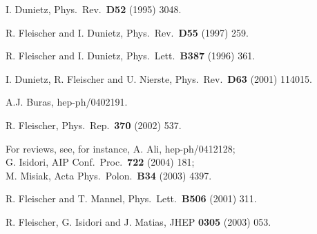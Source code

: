 \documentclass[11pt]{cernrep}
\begin{document}
\begin{thebibliography}{999}
I. Dunietz,
{ Phys.\ Rev.}~{\bf D52} (1995) 3048.

R. Fleischer and I. Dunietz,
{ Phys.\ Rev.}~{\bf D55} (1997) 259.

R. Fleischer and I. Dunietz,
{ Phys.\ Lett.}~{\bf B387} (1996) 361.

I. Dunietz, R. Fleischer and U. Nierste,
  { Phys.\ Rev.}~{\bf D63} (2001) 114015.

A.J. Buras,
hep-ph/0402191.


R. Fleischer,
  { Phys.\ Rep.}~{\bf 370} (2002) 537.

For reviews, see, for instance, 
A. Ali,
  hep-ph/0412128;\\
  G. Isidori,
  { AIP Conf.\ Proc.}~{\bf 722} (2004) 181;\\
  M. Misiak,
  { Acta Phys.\ Polon.}~{\bf B34} (2003) 4397.

R. Fleischer and T. Mannel,
  { Phys.\ Lett.}~{\bf B506} (2001) 311.

R. Fleischer, G. Isidori and J. Matias,
  { JHEP} {\bf 0305} (2003) 053.
  

\end{thebibliography}
\end{document}
